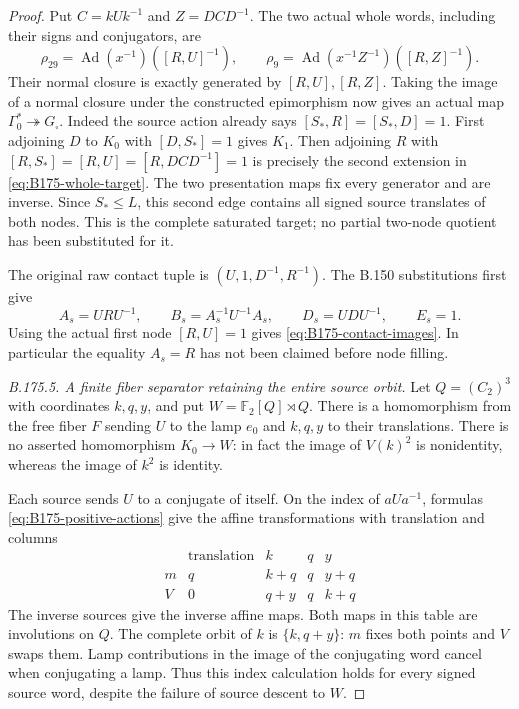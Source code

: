 \begin{proof}
Put \(C=kUk^{-1}\) and \(Z=DCD^{-1}\). The two actual whole words,
including their signs and conjugators, are
\begin{equation}\label{eq:B175-exact-nodes}
 \rho_{29}=\operatorname{Ad}(x^{-1})([R,U]^{-1}),\qquad
 \rho_9=\operatorname{Ad}(x^{-1}Z^{-1})([R,Z]^{-1}).
\end{equation}
Their normal closure is exactly generated by \([R,U],[R,Z]\).
Taking the image of a normal closure under the constructed epimorphism
now gives an actual map \(\Gamma _0^*\twoheadrightarrow G_\square\).
Indeed the source action already says \([S_*,R]=[S_*,D]=1\).
First adjoining \(D\) to \(K_0\) with \([D,S_*]=1\) gives \(K_1\).
Then adjoining \(R\) with \([R,S_*]=[R,U]=[R,DCD^{-1}]=1\)
is precisely the second extension in \eqref{eq:B175-whole-target}.
The two presentation maps fix every generator and are inverse.
Since \(S_*\le L\), this second edge contains all signed source
translates of both nodes. This is the complete saturated target;
no partial two-node quotient has been substituted for it.

The original raw contact tuple is \((U,1,D^{-1},R^{-1})\).
The B.150 substitutions first give
\[
 A_s=URU^{-1},\qquad B_s=A_s^{-1}U^{-1}A_s,
 \qquad D_s=UDU^{-1},\qquad E_s=1.
\]
Using the actual first node \([R,U]=1\) gives
\eqref{eq:B175-contact-images}. In particular the equality \(A_s=R\)
has not been claimed before node filling.

\emph{B.175.5. A finite fiber separator retaining the entire source orbit.}
Let \(Q=(C_2)^3\) with coordinates \(k,q,y\), and put
\(W=\mathbb F_2[Q]\rtimes Q\). There is a homomorphism from the free
fiber \(F\) sending \(U\) to the lamp \(e_0\) and \(k,q,y\) to their
translations. There is no asserted homomorphism \(K_0\to W\): in fact
the image of \(V(k)^2\) is nonidentity, whereas the image of \(k^2\)
is identity.

Each source sends \(U\) to a conjugate of itself. On the index of
\(aUa^{-1}\), formulas \eqref{eq:B175-positive-actions} give the
affine transformations with translation and columns
\[
 \begin{array}{c|c|ccc}
 &\text{translation}&k&q&y\\\hline
 m&q&k+q&q&y+q\\
 V&0&q+y&q&k+q
 \end{array}
 \tag{B.175.3}
\]
The inverse sources give the inverse affine maps. Both maps in this
table are involutions on \(Q\). The complete orbit of \(k\) is
\(\{k,q+y\}\): \(m\) fixes both points and \(V\) swaps them.
Lamp contributions in the image of the conjugating word cancel when
conjugating a lamp. Thus this index calculation holds for every signed
source word, despite the failure of source descent to \(W\).


\end{proof}
